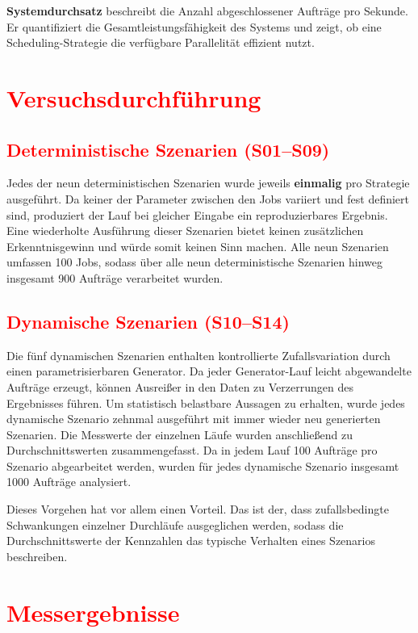 \documentclass[
    12pt,               
    a4paper,            
    ngerman,            
    parskip=half,       
    headings=normal,   
    numbers=enddot,     
    toc=chapterentrywithdots 
]{scrreprt}\usepackage[utf8]{inputenc}
\begin{document}
\textbf{Systemdurchsatz} beschreibt die Anzahl abgeschlossener Aufträge pro Sekunde. Er quantifiziert die Gesamtleistungsfähigkeit des Systems und zeigt, ob eine Scheduling-Strategie die verfügbare Parallelität effizient nutzt.

\section{\textcolor{red}{Versuchsdurchführung}}
\subsection{\textcolor{red}{Deterministische Szenarien (S01--S09)}}
Jedes der neun deterministischen Szenarien wurde jeweils \textbf{einmalig} pro Strategie ausgeführt. Da keiner der Parameter zwischen den Jobs variiert und fest definiert sind, produziert der Lauf bei gleicher Eingabe ein reproduzierbares Ergebnis. Eine wiederholte Ausführung dieser Szenarien bietet keinen zusätzlichen Erkenntnisgewinn und würde somit keinen Sinn machen. Alle neun Szenarien umfassen 100 Jobs, sodass über alle neun deterministische Szenarien hinweg insgesamt 900 Aufträge verarbeitet wurden.

\subsection{\textcolor{red}{Dynamische Szenarien (S10--S14)}}
Die fünf dynamischen Szenarien enthalten kontrollierte Zufallsvariation durch einen parametrisierbaren Generator. Da jeder Generator-Lauf leicht abgewandelte Aufträge erzeugt, können Ausreißer in den Daten zu Verzerrungen des Ergebnisses führen. Um statistisch belastbare Aussagen zu erhalten, wurde jedes dynamische Szenario zehnmal ausgeführt mit immer wieder neu generierten Szenarien. Die Messwerte der einzelnen Läufe wurden anschließend zu Durchschnittswerten zusammengefasst. Da in jedem Lauf 100 Aufträge pro Szenario abgearbeitet werden, wurden für jedes dynamische Szenario insgesamt 1000 Aufträge analysiert.

Dieses Vorgehen hat vor allem einen Vorteil. Das ist der, dass zufallsbedingte Schwankungen einzelner Durchläufe ausgeglichen werden, sodass die Durchschnittswerte der Kennzahlen das typische Verhalten eines Szenarios beschreiben.

\section{\textcolor{red}{Messergebnisse}}
\end{document}
